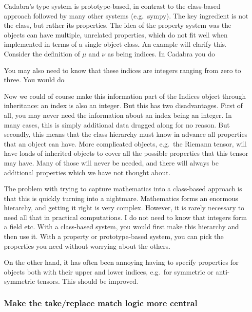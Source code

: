 \documentclass[11pt]{article}
\begin{document}
Cadabra's type system is prototype-based, in contrast to the
class-based approach followed by many other systems (e.g.~sympy). 
The key ingredient is not the class, but rather its properties.
The idea of the property system was the objects can have multiple,
unrelated properties, which do not fit well when implemented in terms
of a single object class. An example will clarify this. Consider the
definition of $\mu$ and $\nu$ as being indices. In Cadabra you do
\begin{quote}
\end{quote}
You may also need to know that these indices are integers ranging from
zero to three. You would do
\begin{quote}
\end{quote}
Now we could of course make this information part of the Indices
object through inheritance: an index is also an integer. But this has
two disadvantages. First of all, you may never need the information
about an index being an integer. In many cases, this is simply
additional data dragged along for no reason. But secondly, this means
that the class hierarchy must know in advance all properties that an
object can have. More complicated objects, e.g.~the Riemann tensor,
will have loads of inherited objects to cover all the possible
properties that this tensor may have. Many of those will never be
needed, and there will always be additional properties which we have
not thought about. 

The problem with trying to capture mathematics into a class-based
approach is that this is quickly turning into a nightmare. Mathematics
forms an enormous hierarchy, and getting it right is very
complex. However, it is rarely necessary to need all that in practical
computations. I do not need to know that integers form a field
etc. With a class-based system, you would first make this hierarchy
and then use it. With a property or prototype-based system, you can
pick the properties you need without worrying about the others.



On the other hand, it has often been annoying having to specify
properties for objects both with their upper and lower indices,
e.g.~for symmetric or anti-symmetric tensors. This should be improved.

\subsubsection{Make the take/replace match logic more central}
\end{document}
